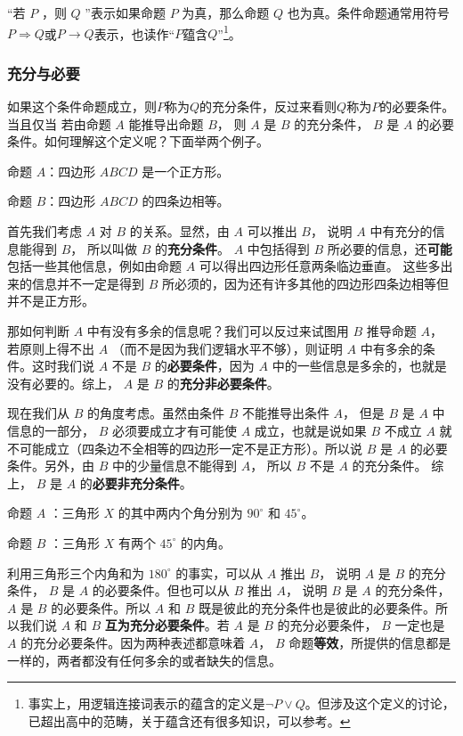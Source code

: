 “若 $P$ ，则 $Q$ ”表示如果命题 $P$ 为真，那么命题 $Q$ 也为真。条件命题通常用符号$P\Rightarrow Q$或$P\rightarrow Q$表示，也读作“$P$蕴含$Q$”\footnote{事实上，用逻辑连接词表示的蕴含的定义是$\lnot P\lor Q$。但涉及这个定义的讨论，已超出高中的范畴，关于蕴含还有很多知识，可以参考。}。

\subsubsection{充分与必要}

如果这个条件命题成立，则$P$称为$Q$的充分条件，反过来看则$Q$称为$P$的必要条件。
当且仅当
若由命题 $A$ 能推导出命题 $B$， 则 $A$ 是 $B$ 的充分条件， $B$ 是 $A$ 的必要条件。如何理解这个定义呢？下面举两个例子。

\begin{example}{}
命题 $A$：四边形 $ABCD$ 是一个正方形。

命题 $B$：四边形 $ABCD$ 的四条边相等。

首先我们考虑 $A$ 对 $B$ 的关系。显然，由 $A$ 可以推出 $B$， 说明 $A$ 中有充分的信息能得到 $B$， 所以叫做 $B$ 的\textbf{充分条件}。 $A$ 中包括得到 $B$ 所必要的信息，还\textbf{可能}包括一些其他信息，例如由命题 $A$ 可以得出四边形任意两条临边垂直。 这些多出来的信息并不一定是得到 $B$ 所必须的，因为还有许多其他的四边形四条边相等但并不是正方形。

那如何判断 $A$ 中有没有多余的信息呢？我们可以反过来试图用 $B$ 推导命题 $A$， 若原则上得不出 $A$ （而不是因为我们逻辑水平不够），则证明 $A$ 中有多余的条件。这时我们说 $A$ 不是 $B$ 的\textbf{必要条件}，因为 $A$ 中的一些信息是多余的，也就是没有必要的。综上， $A$ 是 $B$ 的\textbf{充分非必要条件}。

现在我们从 $B$ 的角度考虑。虽然由条件 $B$ 不能推导出条件 $A$， 但是 $B$ 是 $A$ 中信息的一部分， $B$ 必须要成立才有可能使 $A$ 成立，也就是说如果 $B$ 不成立 $A$ 就不可能成立（四条边不全相等的四边形一定不是正方形）。所以说 $B$ 是 $A$ 的必要条件。另外，由 $B$ 中的少量信息不能得到 $A$， 所以 $B$ 不是 $A$ 的充分条件。 综上， $B$ 是 $A$ 的\textbf{必要非充分条件}。
\end{example}


\begin{example}{}
命题 $A$ ：三角形 $X$ 的其中两内个角分别为 $90^\circ$ 和 $45^\circ$。

命题 $B$ ：三角形 $X$ 有两个 $45^\circ$ 的内角。

利用三角形三个内角和为 $180^\circ$ 的事实，可以从 $A$ 推出 $B$， 说明 $A$ 是 $B$ 的充分条件， $B$ 是 $A$ 的必要条件。但也可以从 $B$ 推出 $A$， 说明 $B$ 是 $A$ 的充分条件， $A$ 是 $B$ 的必要条件。所以 $A$ 和 $B$ 既是彼此的充分条件也是彼此的必要条件。所以我们说 $A$ 和 $B$ \textbf{互为充分必要条件}。若 $A$ 是 $B$ 的充分必要条件， $B$ 一定也是 $A$ 的充分必要条件。因为两种表述都意味着 $A$，  $B$ 命题\textbf{等效}，所提供的信息都是一样的，两者都没有任何多余的或者缺失的信息。
\end{example}

